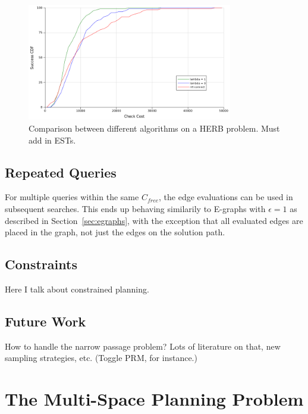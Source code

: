 \documentclass{report}
\begin{document}
\begin{figure}
\centering
\includegraphics[width=0.8\textwidth]{figs/timegreedy-herbstep1-comparison-cdfs.png}
\caption{Comparison between different algorithms on a HERB problem.
   Must add in ESTs.}
\label{fig:herb-comparison-cdfs}
\end{figure}

\section{Repeated Queries}

For multiple queries within the same $C_{free}$,
the edge evaluations can be used in subsequent searches.
This ends up behaving similarily to E-graphs \cite{phillips2012egraphs}
with $\epsilon=1$
as described in Section~\ref{sec:egraphs},
with the exception that all evaluated edges are placed in the graph,
not just the edges on the solution path.

\section{Constraints}
\label{sec:constraints}

Here I talk about constrained planning.

\section{Future Work}

How to handle the narrow passage problem?
Lots of literature on that, new sampling strategies, etc.
(Toggle PRM, for instance.)



\newpage
\chapter{The Multi-Space Planning Problem}
\label{chap:multispace}
\end{document}
